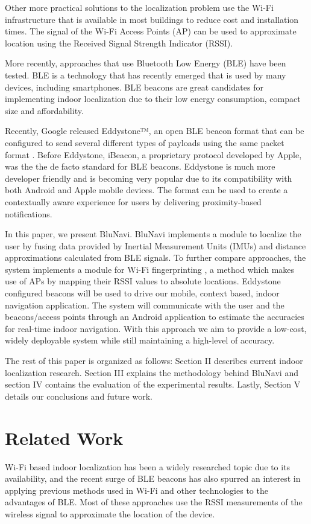 \documentclass[conference]{IEEEtran}
\begin{document}
Other more practical solutions to the localization problem use the Wi-Fi infrastructure that is available in most buildings to reduce cost and installation times. The signal of the Wi-Fi Access Points (AP) can be used to approximate location using the Received Signal Strength Indicator (RSSI).

More recently, approaches that use Bluetooth Low Energy (BLE) have been tested. BLE is a technology that has recently emerged that is used by many devices, including smartphones. BLE beacons are great candidates for implementing indoor localization due to their low energy consumption, compact size and affordability.

Recently, Google released Eddystone™, an open BLE beacon format that can be configured to send several different types of payloads using the same packet format \cite{Eddystone}. Before Eddystone, iBeacon, a proprietary protocol developed by Apple, was the the de facto standard for BLE beacons. Eddystone is much more developer friendly and is becoming very popular due to its compatibility with both Android and Apple mobile devices. The format can be used to create a contextually aware experience for users by delivering proximity-based notifications.

In this paper, we present BluNavi. BluNavi implements a module to localize the user by fusing data provided by Inertial Measurement Units (IMUs) and distance approximations calculated from BLE signals. To further compare approaches, the system implements a module for Wi-Fi fingerprinting , a method which makes use of APs by mapping their RSSI values to absolute locations. Eddystone configured beacons will be used to drive our mobile, context based, indoor navigation application. The system will communicate with the user and the beacons/access points through an Android application to estimate the accuracies for real-time indoor navigation. With this approach we aim to provide a low-cost, widely deployable system while still maintaining  a high-level of accuracy.

The rest of this paper is organized as follows: Section II describes current indoor localization research. Section III explains the methodology behind BluNavi and section IV contains the evaluation of the experimental results. Lastly, Section V details our conclusions and future work.


\section{Related Work}
Wi-Fi based indoor localization has been a widely researched topic due to its availability, and the recent surge of BLE beacons has also spurred an interest in applying previous methods used in Wi-Fi and other technologies to the advantages of BLE. Most of these approaches use the RSSI measurements of the wireless signal to approximate the location of the device.
\end{document}
